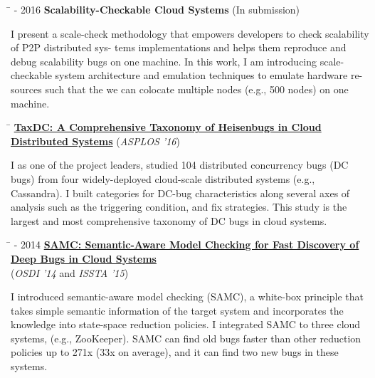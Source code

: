\documentclass[10pt]{article} %
\begin{document}
\begin{tabbing}
\hspace{2.5cm} \=  - 2016 \>\+ \textbf{Scalability-Checkable Cloud Systems} (In submission) \\
\begin{minipage}{\smallertextwidth}
I present a scale-check methodology that empowers developers to check
scalability of P2P distributed sys- tems implementations and helps them
reproduce and debug scalability bugs on one machine. In this work, I am
introducing scale-checkable system architecture and emulation techniques to
emulate hardware re- sources such that the we can colocate multiple nodes (e.g.,
500 nodes) on one machine.
\end{minipage}
\end{tabbing}

\begin{tabbing}
\hspace{2.5cm} \=  \>\+ \href{http://ucare.cs.uchicago.edu/pdf/asplos16-TaxDC.pdf}{\textbf{TaxDC: A Comprehensive Taxonomy of Heisenbugs in Cloud Distributed Systems}} (\textit{ASPLOS '16}) \\
\begin{minipage}{\smallertextwidth}
I as one of the project leaders, studied 104 distributed concurrency bugs (DC
bugs) from four widely-deployed cloud-scale distributed systems (e.g.,
Cassandra). I built categories for DC-bug characteristics along several axes of
analysis such as the triggering condition, and fix strategies. This study is the
largest and most comprehensive taxonomy of DC bugs in cloud systems.
\end{minipage}
\end{tabbing}

\begin{tabbing}
\hspace{2.5cm} \=  - 2014 \> \href{http://ucare.cs.uchicago.edu/pdf/osdi14-samc.pdf}{\textbf{SAMC: Semantic-Aware Model Checking for Fast Discovery of Deep Bugs in Cloud Systems}} \\
\>\+ (\textit{OSDI '14} and \textit{ISSTA '15}) \\
\begin{minipage}{\smallertextwidth}
I introduced semantic-aware model checking (SAMC), a white-box principle that
takes simple semantic information of the target system and incorporates the
knowledge into state-space reduction policies. I integrated SAMC to three cloud
systems, (e.g., ZooKeeper). SAMC can find old bugs faster than other reduction
policies up to 271x (33x on average), and it can find two new bugs in these
systems.
\end{minipage}
\end{tabbing}
\end{document}
